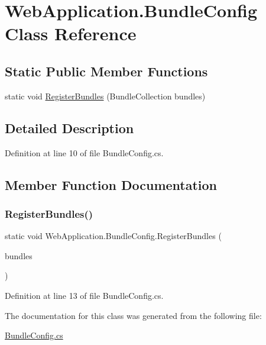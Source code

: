 \hypertarget{classWebApplication_1_1BundleConfig}{}\section{Web\+Application.\+Bundle\+Config Class Reference}
\label{classWebApplication_1_1BundleConfig}
\subsection*{Static Public Member Functions}
\begin{DoxyCompactItemize}
\item 
static void \mbox{\hyperlink{classWebApplication_1_1BundleConfig_ae7996f334a178306dd44a72beebc2494}{Register\+Bundles}} (Bundle\+Collection bundles)
\end{DoxyCompactItemize}


\subsection{Detailed Description}


Definition at line 10 of file Bundle\+Config.\+cs.



\subsection{Member Function Documentation}
\mbox{\label{classWebApplication_1_1BundleConfig_ae7996f334a178306dd44a72beebc2494}} 
\subsubsection{\texorpdfstring{RegisterBundles()}{RegisterBundles()}}
{\footnotesize\ttfamily static void Web\+Application.\+Bundle\+Config.\+Register\+Bundles (\begin{DoxyParamCaption}\item[{Bundle\+Collection}]{bundles }\end{DoxyParamCaption})\hspace{0.3cm}{\ttfamily [static]}}



Definition at line 13 of file Bundle\+Config.\+cs.



The documentation for this class was generated from the following file\+:\begin{DoxyCompactItemize}
\item 
\mbox{\hyperlink{BundleConfig_8cs}{Bundle\+Config.\+cs}}\end{DoxyCompactItemize}
